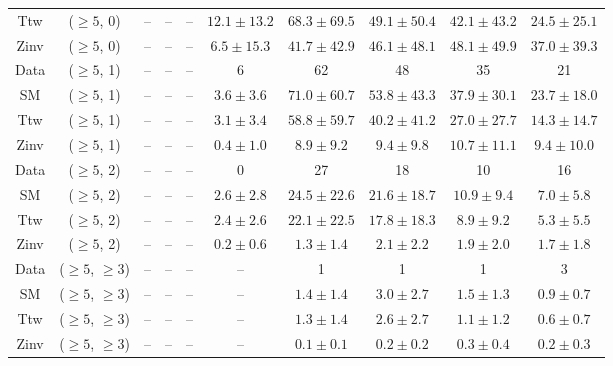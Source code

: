 \begin{table}[h!]
{\begin{tabular}{cccccccccc}
	Ttw & ($\ge5$, 0) & -- & -- & -- & $12.1\pm 13.2$ & $68.3\pm 69.5$ & $49.1\pm 50.4$ & $42.1\pm 43.2$ & $24.5\pm 25.1$ \\[0.5ex] 
	Zinv & ($\ge5$, 0) & -- & -- & -- & $6.5\pm 15.3$ & $41.7\pm 42.9$ & $46.1\pm 48.1$ & $48.1\pm 49.9$ & $37.0\pm 39.3$ \\[0.5ex] 
	Data & ($\ge5$, 1) & -- & -- & -- & 6 & 62 & 48 & 35 & 21 \\[0.5ex] 
	SM & ($\ge5$, 1) & -- & -- & -- & $3.6\pm 3.6$ & $71.0\pm 60.7$ & $53.8\pm 43.3$ & $37.9\pm 30.1$ & $23.7\pm 18.0$ \\[0.5ex] 
	Ttw & ($\ge5$, 1) & -- & -- & -- & $3.1\pm 3.4$ & $58.8\pm 59.7$ & $40.2\pm 41.2$ & $27.0\pm 27.7$ & $14.3\pm 14.7$ \\[0.5ex] 
	Zinv & ($\ge5$, 1) & -- & -- & -- & $0.4\pm 1.0$ & $8.9\pm 9.2$ & $9.4\pm 9.8$ & $10.7\pm 11.1$ & $9.4\pm 10.0$ \\[0.5ex] 
	Data & ($\ge5$, 2) & -- & -- & -- & 0 & 27 & 18 & 10 & 16 \\[0.5ex] 
	SM & ($\ge5$, 2) & -- & -- & -- & $2.6\pm 2.8$ & $24.5\pm 22.6$ & $21.6\pm 18.7$ & $10.9\pm 9.4$ & $7.0\pm 5.8$ \\[0.5ex] 
	Ttw & ($\ge5$, 2) & -- & -- & -- & $2.4\pm 2.6$ & $22.1\pm 22.5$ & $17.8\pm 18.3$ & $8.9\pm 9.2$ & $5.3\pm 5.5$ \\[0.5ex] 
	Zinv & ($\ge5$, 2) & -- & -- & -- & $0.2\pm 0.6$ & $1.3\pm 1.4$ & $2.1\pm 2.2$ & $1.9\pm 2.0$ & $1.7\pm 1.8$ \\[0.5ex] 
	Data & ($\ge5$, $\ge3$) & -- & -- & -- & -- & 1 & 1 & 1 & 3 \\[0.5ex] 
	SM & ($\ge5$, $\ge3$) & -- & -- & -- & -- & $1.4\pm 1.4$ & $3.0\pm 2.7$ & $1.5\pm 1.3$ & $0.9\pm 0.7$ \\[0.5ex] 
	Ttw & ($\ge5$, $\ge3$) & -- & -- & -- & -- & $1.3\pm 1.4$ & $2.6\pm 2.7$ & $1.1\pm 1.2$ & $0.6\pm 0.7$ \\[0.5ex] 
	Zinv & ($\ge5$, $\ge3$) & -- & -- & -- & -- & $0.1\pm 0.1$ & $0.2\pm 0.2$ & $0.3\pm 0.4$ & $0.2\pm 0.3$ \\[0.5ex] 
	\hline
	\hline
\end{tabular}}
\end{table}
